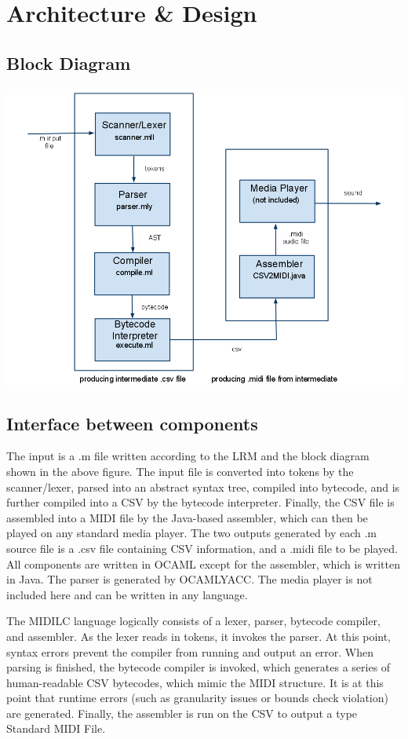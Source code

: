 \documentclass[12pt,A4]{book}
\begin{document}
\chapter{Architecture \& Design}
\section{Block Diagram}

\includegraphics[width=\textwidth]{blockdiagram.png}

\section{Interface between components}
The input is a .m file written according to the LRM and the block diagram shown in the above figure. The input file is converted into tokens by the scanner/lexer, parsed into an abstract syntax tree, compiled into bytecode, and is further compiled into a CSV by the bytecode interpreter. Finally, the CSV file is assembled into a MIDI file by the Java-based assembler, which can then be played on any standard media player.  The two outputs generated by each .m source file is a .csv file containing CSV information, and a .midi file to be played.  All components are written in OCAML except for the assembler, which is written in Java.  The parser is generated by OCAMLYACC.  The media player is not included here and can be written in any language.

The MIDILC language logically consists of a lexer, parser, bytecode compiler, and assembler.  As the lexer reads in tokens, it invokes the parser.  At this point, syntax errors prevent the compiler from running and output an error.  When parsing is finished, the bytecode compiler is invoked, which generates a series of human-readable CSV bytecodes, which mimic the MIDI structure.  It is at this point that runtime errors (such as granularity issues or bounds check violation) are generated.  Finally, the assembler is run on the CSV to output a type Standard MIDI File.
\end{document}
